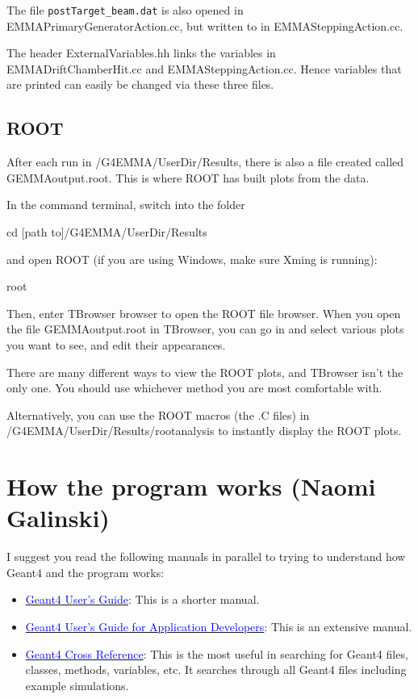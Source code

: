\documentclass{article}
\newcommand{\filefont}[1]{{\fontfamily{pnc}\selectfont #1}\xspace}
\newcommand{\hrefcolor}[2]{\href{#1}{\textcolor{blue}{#2}}\xspace}
\begin{document}
The file \texttt{postTarget\_beam.dat} is also opened in EMMAPrimaryGeneratorAction.cc, but written to in EMMASteppingAction.cc. 

The header ExternalVariables.hh links the variables in EMMADriftChamberHit.cc and EMMASteppingAction.cc. Hence variables that are printed can easily be changed via these three files. 



\subsection{ROOT}

After each run in \filefont{[path to]/G4EMMA/UserDir/Results}, there is also a file created called GEMMAoutput.root. This is where ROOT has built plots from the data. 

In the command terminal, switch into the folder

\filefont{cd [path to]/G4EMMA/UserDir/Results}

and open ROOT (if you are using Windows, make sure Xming is running): 

\filefont{root}

Then, enter \filefont{TBrowser browser} to open the ROOT file browser. When you open the file GEMMAoutput.root in TBrowser, you can go in and select various plots you want to see, and edit their appearances. 

There are many different ways to view the ROOT plots, and TBrowser isn't the only one. You should use whichever method you are most comfortable with. 

Alternatively, you can use the ROOT macros (the .C files) in \filefont{[path to]/G4EMMA/UserDir/Results/rootanalysis} to instantly display the ROOT plots. 

\section{How the program works (Naomi Galinski)} \label{howitworks}

I suggest you read the following manuals in parallel to trying to understand how Geant4 and the program works:
\begin{itemize}
\item \hrefcolor{http://amdahl.physics.purdue.edu/geant/applDeveloperMerged.pdf}{Geant4 User's Guide}: This is a shorter manual.
\item \hrefcolor{http://geant4.web.cern.ch/geant4/UserDocumentation/UsersGuides/ForApplicationDeveloper/html/index.html}{Geant4 User's Guide for Application Developers}: This is an extensive manual.
\item \hrefcolor{http://www-geant4.kek.jp/LXR/}{Geant4 Cross Reference}: This is the most useful in searching for Geant4 files, classes, methods, variables, etc. It searches through all Geant4 files including example simulations.
\end{itemize}
\end{document}
